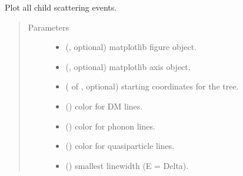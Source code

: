 \documentclass[letterpaper,10pt,english]{sphinxmanual}
\begin{document}
\begin{fulllineitems}
\label{\detokenize{analysis:scdc.plot.tree_plot}}
Plot all child scattering events.
\begin{quote}\begin{description}
\item[{Parameters}] \leavevmode\begin{itemize}
\item {} 
 (, optional) \textendash{} matplotlib figure object.

\item {} 
 (, optional) \textendash{} matplotlib axis object.

\item {} 
 ( of , optional) \textendash{} starting
coordinates for the tree.

\item {} 
 (\sphinxstyleliteralemphasis{\sphinxupquote{, }}) \textendash{} color for DM lines.

\item {} 
 (\sphinxstyleliteralemphasis{\sphinxupquote{, }}) \textendash{} color for phonon lines.

\item {} 
 (\sphinxstyleliteralemphasis{\sphinxupquote{, }}) \textendash{} color for quasiparticle lines.

\item {} 
 (\sphinxstyleliteralemphasis{\sphinxupquote{, }}) \textendash{} smallest linewidth (E = Delta).


\end{itemize}
\end{description}
\end{quote}
\end{fulllineitems}
\end{document}

